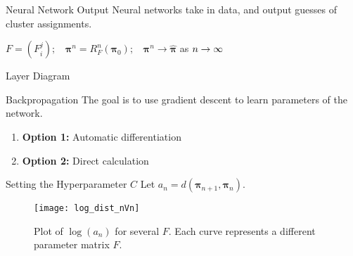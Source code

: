 \documentclass{beamer}
\begin{document}
	\begin{frame}{Neural Network Output}
		Neural networks take in data, and output guesses of cluster assignments.
		\begin{center}
			\(F=(F_i^{j});\;\) \(\;\bm\pi^n=R_F^n(\bm\pi_0);\;\) \(\;\bm\pi^n\rightarrow\hat{\bm\pi} \) as \( n\rightarrow\infty \)
		\end{center}
	\end{frame}
	
	\begin{frame}{Layer Diagram}
		\begin{figure}
			\centering
				
		\end{figure}
	\end{frame}
	
	\begin{frame}{Backpropagation}
		The goal is to use gradient descent to learn parameters of the network.
		\begin{enumerate}
			\item[]\textbf{Option 1:} Automatic differentiation
			\item[]\textbf{Option 2:} Direct calculation
		\end{enumerate}
	\end{frame}

	\begin{frame}{Setting the Hyperparameter $C$}
			Let \( a_n = d(\bm\pi_{n+1},\bm\pi_n) \).
			\begin{figure}
				\centering
				\texttt{[image: log\_dist\_nVn]}
				\caption{Plot of \(\log(a_n)\) for several \(F\). Each curve represents a different parameter matrix \(F\).}
			\end{figure}
	\end{frame}
\end{document}
